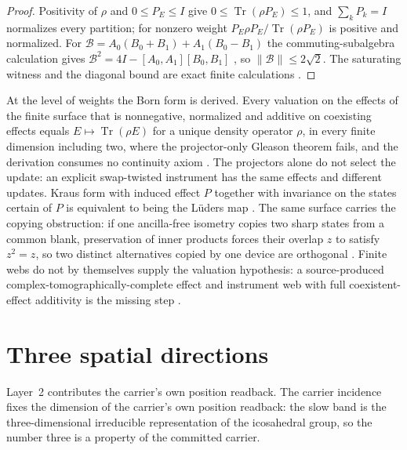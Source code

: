 \documentclass[11pt]{article}
\theoremstyle{definition}
\theoremstyle{remark}
\begin{document}
\begin{proof}
Positivity of $\rho$ and $0\le P_E\le I$ give $0\le\operatorname{Tr}(\rho
P_E)\le1$, and $\sum_kP_k=I$ normalizes every partition; for nonzero weight
$P_E\rho P_E/\operatorname{Tr}(\rho P_E)$ is positive and normalized. For
$\mathcal B=A_0(B_0+B_1)+A_1(B_0-B_1)$ the commuting-subalgebra calculation
gives $\mathcal B^2=4I-[A_0,A_1][B_0,B_1]$ \cite{landau1987}, so $\|\mathcal B\|\le2\sqrt2$.
The saturating witness and the diagonal bound are exact finite calculations
\cite{opheventalgebra}.
\end{proof}

At the level of weights the Born form is derived. Every valuation on the
effects of the finite surface that is nonnegative, normalized and additive on
coexisting effects equals $E\mapsto\operatorname{Tr}(\rho E)$ for a unique
density operator $\rho$, in every finite dimension including two, where the
projector-only Gleason theorem fails, and the derivation consumes no continuity axiom \cite{gleason1957,busch2003}. The projectors alone do not select the update: an explicit swap-twisted instrument has the same effects and different updates.
Kraus form with induced effect $P$ together with invariance on the states
certain of $P$ is equivalent to being the L\"uders map
\cite{luders1950,opheventalgebra}. The same surface carries the copying
obstruction: if one ancilla-free isometry copies two sharp states from a
common blank, preservation of inner products forces their overlap $z$ to
satisfy $z^2=z$, so two distinct alternatives copied by one device are orthogonal \cite{wootterszurek1982,dieks1982}. Finite webs do not by themselves supply the valuation
hypothesis: a source-produced complex-tomographically-complete effect and
instrument web with full coexistent-effect additivity is the missing step
\cite{opheventalgebra}.

\section{Three spatial directions}
\label{sec:three-directions}

Layer~2 contributes the carrier's own position readback.
The carrier incidence fixes the dimension of the carrier's own position
readback: the slow band is the three-dimensional irreducible representation
of the icosahedral group, so the number three is a property of the committed
carrier.
\end{document}
